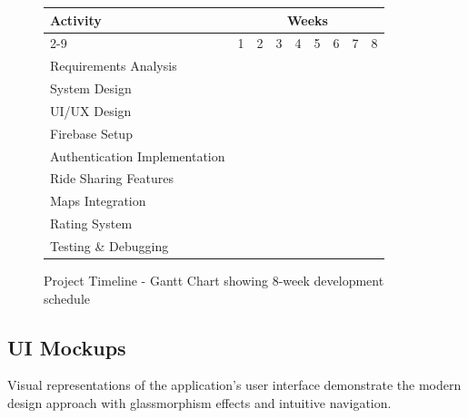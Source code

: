 \documentclass[12pt,a4paper]{article}
\begin{document}
\begin{figure}[H]
    \centering
    \begin{tabular}{|l|c|c|c|c|c|c|c|c|}
        \hline
        \textbf{Activity} & \multicolumn{8}{c|}{\textbf{Weeks}} \\
        \cline{2-9}
        & 1 & 2 & 3 & 4 & 5 & 6 & 7 & 8 \\
        \hline
        Requirements Analysis & \cellcolor{blue!30} & \cellcolor{blue!30} & & & & & & \\
        \hline
        System Design & & \cellcolor{green!30} & \cellcolor{green!30} & & & & & \\
        \hline
        UI/UX Design & & & \cellcolor{orange!30} & \cellcolor{orange!30} & & & & \\
        \hline
        Firebase Setup & & & \cellcolor{red!30} & & & & & \\
        \hline
        Authentication Implementation & & & & \cellcolor{purple!30} & \cellcolor{purple!30} & & & \\
        \hline
        Ride Sharing Features & & & & & \cellcolor{cyan!30} & \cellcolor{cyan!30} & & \\
        \hline
        Maps Integration & & & & & & \cellcolor{yellow!30} & \cellcolor{yellow!30} & \\
        \hline
        Rating System & & & & & & & \cellcolor{pink!30} & \\
        \hline
        Testing \& Debugging & & & & & & & & \cellcolor{gray!30} \\
        \hline
    \end{tabular}
    \caption{Project Timeline - Gantt Chart showing 8-week development schedule}
    \label{fig:ganttchart}
\end{figure}

\subsection{UI Mockups}

Visual representations of the application's user interface demonstrate the modern design approach with glassmorphism effects and intuitive navigation.
\end{document}
